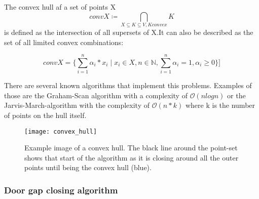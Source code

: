 The convex hull af a set of points X \begin{equation}conv X \coloneqq \underset{X \subseteq K \subseteq V, K convex}{\bigcap} K  \end{equation} is defined as the intersection of all supersets of X.It can also be described as the set of all limited convex combinations:

\begin{equation}conv X = \{ \sum_{i=1}^{n}\alpha_{i} * x_{i} \mid x_{i} \in X, n \in \mathbb{N}, \sum_{i=1}^{n} \alpha_i = 1, \alpha_i \geq 0  \}]\end{equation}

There are several known algorithms that implement this problems. Examples of those are the Graham-Scan algorithm with a complexity of  $\mathcal{O}(n log n)$ or the Jarvis-March-algorithm with the complexity of $\mathcal{O}(n*k)$ where k is the number of points on the hull itself.

\begin{figure}[h]
	\centering
	\texttt{[image: convex\_hull]}
	\caption{Example image of a convex hull. The black line around the point-set shows that start of the algorithm as it is closing around all the outer points until  being the convex hull (blue).}
	\label{fig:convex_hull}
\end{figure}


\pagebreak

\subsubsection{Door gap closing algorithm}
\label{sec:DoorGapAlgorithm}

